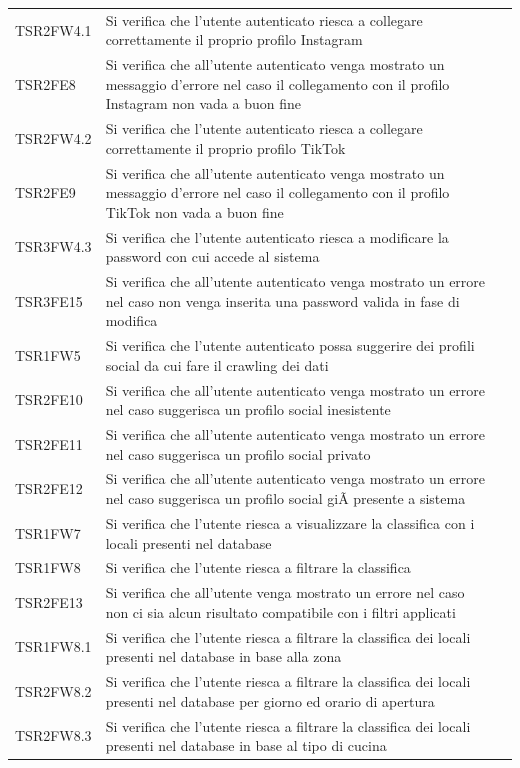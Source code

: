 \begin{longtable}{ m{}<{\centering}  m{}<{\centering}  m{}<{\centering} }
	TSR2FW4.1 & Si verifica che l'utente autenticato riesca a collegare correttamente il proprio profilo Instagram & \Ni \\
	TSR2FE8 & Si verifica che all'utente autenticato venga mostrato un messaggio d'errore nel caso il collegamento con il profilo Instagram non vada a buon fine & \Ni \\
	TSR2FW4.2 & Si verifica che l'utente autenticato riesca a collegare correttamente il proprio profilo TikTok & \Ni \\
	TSR2FE9 & Si verifica che all'utente autenticato venga mostrato un messaggio d'errore nel caso il collegamento con il profilo TikTok non vada a buon fine & \Ni \\
	TSR3FW4.3 & Si verifica che l'utente autenticato riesca a modificare la password con cui accede al sistema & \Ni \\
	TSR3FE15 & Si verifica che all'utente autenticato venga mostrato un errore nel caso non venga inserita una password valida in fase di modifica & \Ni \\
	TSR1FW5 & Si verifica che l'utente autenticato possa suggerire dei profili social da cui fare il crawling dei dati & \Ni \\
	TSR2FE10 & Si verifica che all'utente autenticato venga mostrato un errore nel caso suggerisca un profilo social inesistente & \Ni \\
	TSR2FE11 & Si verifica che all'utente autenticato venga mostrato un errore nel caso suggerisca un profilo social privato & \Ni \\
	TSR2FE12 & Si verifica che all'utente autenticato venga mostrato un errore nel caso suggerisca un profilo social giÃ  presente a sistema & \Ni \\
	TSR1FW7 & Si verifica che l'utente riesca a visualizzare la classifica con i locali presenti nel database & \Ni \\
	TSR1FW8 & Si verifica che l'utente riesca a filtrare la classifica & \Ni \\
	TSR2FE13 & Si verifica che all'utente venga mostrato un errore nel caso non ci sia alcun risultato compatibile con i filtri applicati & \Ni \\
	TSR1FW8.1 & Si verifica che l'utente riesca a filtrare la classifica dei locali presenti nel database in base alla zona & \Ni \\
	TSR2FW8.2 & Si verifica che l'utente riesca a filtrare la classifica dei locali presenti nel database per giorno ed orario di apertura & \Ni \\
	TSR2FW8.3 & Si verifica che l'utente riesca a filtrare la classifica dei locali presenti nel database in base al tipo di cucina & \Ni \\

\end{longtable}
